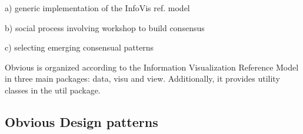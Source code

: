a) generic implementation of the InfoVis ref. model

b) social process involving workshop to build consensus

c) selecting emerging consensual patterns

Obvious is organized according to the Information Visualization Reference Model in three main packages: data, visu and view. Additionally, it provides utility classes in the util package.

\subsection{Obvious Design patterns}
